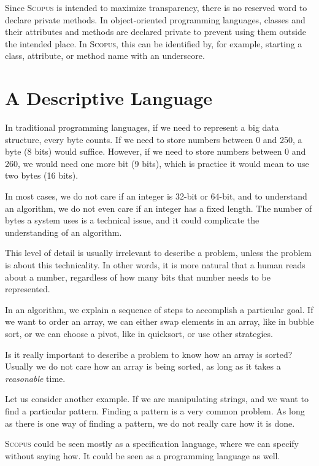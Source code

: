 \documentclass[12pt,a4paper]{book}
\newcommand{\Scopus}{\textsc{Scopus}\xspace}
\begin{document}
    Since \Scopus is intended to maximize transparency, there is no reserved word to declare private methods.
    In object-oriented programming languages, classes and their attributes and methods are declared private to prevent using them outside the intended place.
    In \Scopus, this can be identified by, for example, starting a class, attribute, or method name with an underscore.


    \section{A Descriptive Language}

    In traditional programming languages, if we need to represent a big data structure, every byte counts.
    If we need to store numbers between 0 and 250, a byte (8 bits) would suffice.
    However, if we need to store numbers between 0 and 260, we would need one more bit (9 bits), which is practice it would mean to use two bytes (16 bits).

    In most cases, we do not care if an integer is 32-bit or 64-bit, and to understand an algorithm, we do not even care if an integer has a fixed length.
    The number of bytes a system uses is a technical issue, and it could complicate the understanding of an algorithm.

    This level of detail is usually irrelevant to describe a problem, unless the problem is about this technicality.
    In other words, it is more natural that a human reads about a number, regardless of how many bits that number needs to be represented.

    In an algorithm, we explain a sequence of steps to accomplish a particular goal.
    If we want to order an array, we can either swap elements in an array, like in bubble sort, or we can choose a pivot, like in quicksort, or use other strategies.

    Is it really important to describe a problem to know how an array is sorted?
    Usually we do not care how an array is being sorted, as long as it takes a \textit{reasonable} time.

    Let us consider another example.
    If we are manipulating strings, and we want to find a particular pattern.
    Finding a pattern is a very common problem.
    As long as there is one way of finding a pattern, we do not really care how it is done.

    \Scopus could be seen mostly as a specification language, where we can specify without saying how.
    It could be seen as a programming language as well.
\end{document}
